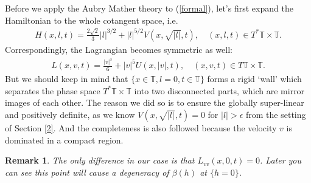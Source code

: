 \documentclass{amsart}
\newtheorem{rmk}[thm]{Remark}
\begin{document}
Before we apply the Aubry Mather theory to (\ref{formal}), let's first expand the Hamiltonian to the whole cotangent space, i.e.
\begin{eqnarray}
H(x,l,t)=\frac{2\sqrt{2}}{3}|l|^{3/2}+|l|^{5/2}V(x,\sqrt{|l|}, t),\quad(x,l,t)\in T^*{\mathbb{T}}\times{\mathbb{T}}.
\end{eqnarray}
Correspondingly, the Lagrangian becomes symmetric as well:
\begin{eqnarray}
L(x,v,t)=\frac{|v|^3}{6}+|v|^5U(x,|v|,t),\quad (x,v,t)\in T{\mathbb{T}}\times{\mathbb{T}}.
\end{eqnarray}
But we should keep in mind that $\{x\in{\mathbb{T}},l=0, t\in{\mathbb{T}}\}$ forms a rigid `wall' which separates the phase space $T^*{\mathbb{T}}\times{\mathbb{T}}$ into two disconnected parts, which are mirror images of each other. The reason we did so is to ensure the globally super-linear and positively definite, as we know $V(x,\sqrt{|l|}, t)=0$ for $|l|>\epsilon$ from the setting of Section \ref{2}. And the completeness is also followed because the velocity $v$ is dominated in a compact region.
\begin{rmk}
The only difference in our case is that $L_{vv}(x,0,t)=0$. Later you can see this point will cause a degeneracy of $\beta(h)$ at $\{h=0\}$.
\end{rmk}
\vspace{10pt}
\end{document}
